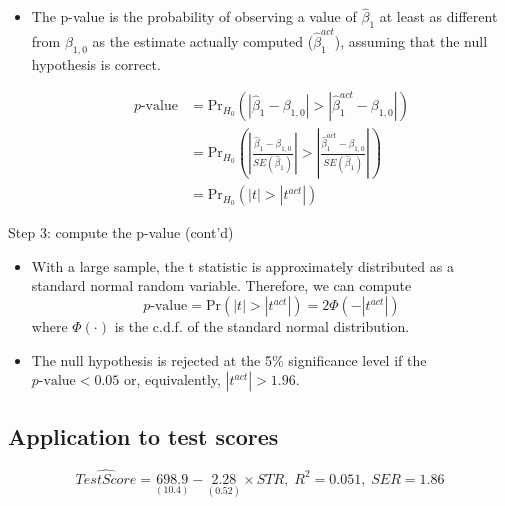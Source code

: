 \documentclass[presentation]{beamer}
\begin{document}
\begin{itemize}
\item The p-value is the probability of observing a value of \(\hat{\beta}_1\)
at least as different from \(\beta_{1,0}\) as the estimate actually
computed (\(\hat{\beta}^{act}_1\)), assuming that the null hypothesis is
correct.

\begin{equation*}
\begin{split}
p\text{-value} &= \mathrm{Pr}_{H_0} \left( | \hat{\beta}_1 - \beta_{1,0} | > | \hat{\beta}^{act}_1 - \beta_{1,0} | \right) \\
&= \mathrm{Pr}_{H_0} \left( \left| \frac{\hat{\beta}_1 - \beta_{1,0}}{SE(\hat{\beta}_1)} \right| > \left| \frac{\hat{\beta}^{act}_1 - \beta_{1,0}}{SE(\hat{\beta}_1)} \right| \right) \\
&= \mathrm{Pr}_{H_0} \left( |t| > |t^{act}| \right)
\end{split}
\end{equation*}
\end{itemize}

\begin{frame}[label={sec:org1a68a02}]{Step 3: compute the p-value (cont'd)}
\begin{itemize}
\item With a large sample, the t statistic is approximately distributed as
a standard normal random variable. Therefore, we can compute
\[p\text{-value} = \mathrm{Pr}\left(|t| > |t^{act}|
  \right) = 2 \Phi(-|t^{act}|)\]
where \(\Phi(\cdot)\) is the c.d.f. of the standard normal
distribution.

\item The null hypothesis is rejected at the 5\% significance level if the
\(p\text{-value} < 0.05\) or, equivalently, \(|t^{act}| > 1.96\).
\end{itemize}
\end{frame}

\subsection*{Application to test scores}
\label{sec:orge20fe23}

\begin{equation*}
\widehat{TestScore} = \underset{\displaystyle (10.4)}{698.9} - \underset{\displaystyle (0.52)}{2.28} \times STR,\; R^2 = 0.051,\; SER = 1.86
\end{equation*}
\end{document}
